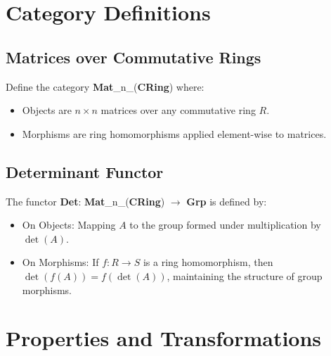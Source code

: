 \begin{example}
\begin{figure}[h!]
\end{figure}
\end{example}

\section{Category Definitions}
\subsection{Matrices over Commutative Rings}
Define the category \textbf{Mat}\_n\_(\textbf{CRing}) where:
\begin{itemize}
	\item Objects are \(n \times n\) matrices over any commutative ring \(R\).
	\item Morphisms are ring homomorphisms applied element-wise to matrices.
\end{itemize}

\subsection{Determinant Functor}
The functor \textbf{Det}: \textbf{Mat}\_n\_(\textbf{CRing}) \(\rightarrow\) \textbf{Grp} is defined by:
\begin{itemize}
	\item On Objects: Mapping \(A\) to the group formed under multiplication by \(\det(A)\).
	\item On Morphisms: If \(f: R \rightarrow S\) is a ring homomorphism, then \(\det(f(A)) = f(\det(A))\), maintaining the structure of group morphisms.
\end{itemize}

\section{Properties and Transformations}
